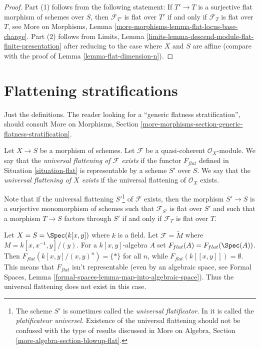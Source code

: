 \begin{proof}
Part (1) follows from the following statement: If $T' \to T$ is a surjective
flat morphism of schemes over $S$, then $\mathcal{F}_{T'}$ is flat over $T'$
if and only if $\mathcal{F}_T$ is flat over $T$, see
More on Morphisms, Lemma \ref{more-morphisms-lemma-flat-locus-base-change}.
Part (2) follows from
Limits, Lemma \ref{limits-lemma-descend-module-flat-finite-presentation}
after reducing to the case where $X$ and $S$ are affine (compare with
the proof of
Lemma \ref{lemma-flat-dimension-n}).
\end{proof}




\section{Flattening stratifications}
\label{section-flattening}

\noindent
Just the definitions. The reader looking for a
``generic flatness stratification'', should consult
More on Morphisms, Section
\ref{more-morphisms-section-generic-flatness-stratification}.

\begin{definition}
\label{definition-flattening}
Let $X \to S$ be a morphism of schemes.
Let $\mathcal{F}$ be a quasi-coherent $\mathcal{O}_X$-module.
We say that the {\it universal flattening of $\mathcal{F}$ exists}
if the functor $F_{flat}$ defined in Situation \ref{situation-flat}
is representable by a scheme $S'$ over $S$.
We say that the {\it universal flattening of $X$ exists}
if the universal flattening of $\mathcal{O}_X$ exists.
\end{definition}

\noindent
Note that if the universal flattening $S'$\footnote{The scheme $S'$ is sometimes
called the {\it universal flatificator}. In \cite{GruRay} it is called
the {\it platificateur universel}. Existence of the universal flattening
should not be confused with the type of results discussed in
More on Algebra, Section \ref{more-algebra-section-blowup-flat}.} of
$\mathcal{F}$ exists, then the morphism $S' \to S$ is a surjective
monomorphism of schemes such that $\mathcal{F}_{S'}$ is flat over $S'$
and such that a morphism $T \to S$ factors through $S'$ if and only if
$\mathcal{F}_T$ is flat over $T$.

\begin{example}
\label{example-no-universal-flattening}
Let $X = S = \Spec(k[x, y])$ where $k$ is a field. Let
$\mathcal{F} = \widetilde{M}$ where $M = k[x, x^{-1}, y]/(y)$.
For a $k[x, y]$-algebra $A$ set $F_{flat}(A) = F_{flat}(\Spec(A))$.
Then $F_{flat}(k[x, y]/(x, y)^n) = \{*\}$ for all $n$, while
$F_{flat}(k[[x, y]]) = \emptyset$. This means that $F_{flat}$ isn't
representable (even by an algebraic space, see
Formal Spaces, Lemma
\ref{formal-spaces-lemma-map-into-algebraic-space}).
Thus the universal flattening does not exist in this case.
\end{example}

